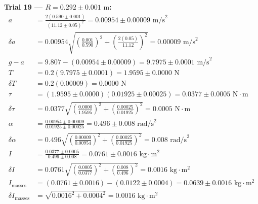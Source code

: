 \documentclass[11pt]{article}
\begin{document}
\textbf{Trial 19 — $R = 0.292 \pm 0.001\text{ m}$:}
\begin{align*}
a &= \frac{2(0.590 \pm 0.001)}{(11.12 \pm 0.05)^2} = 0.00954 \pm 0.00009\text{ m/s}^2 \\
\delta a &= 0.00954\sqrt{\left(\frac{0.001}{0.590}\right)^2 + \left(\frac{2(0.05)}{11.12}\right)^2} = 0.00009\text{ m/s}^2 \\
g - a &= 9.807 - (0.00954 \pm 0.00009) = 9.7975 \pm 0.0001\text{ m/s}^2 \\
T &= 0.2(9.7975 \pm 0.0001) = 1.9595 \pm 0.0000\text{ N} \\
\delta T &= 0.2(0.00009) = 0.0000\text{ N} \\
\tau &= (1.9595 \pm 0.0000)(0.01925 \pm 0.00025) = 0.0377 \pm 0.0005\text{ N}\cdot\text{m} \\
\delta\tau &= 0.0377\sqrt{\left(\frac{0.0000}{1.9595}\right)^2 + \left(\frac{0.00025}{0.01925}\right)^2} = 0.0005\text{ N}\cdot\text{m} \\
\alpha &= \frac{0.00954 \pm 0.00009}{0.01925 \pm 0.00025} = 0.496 \pm 0.008\text{ rad/s}^2 \\
\delta\alpha &= 0.496\sqrt{\left(\frac{0.00009}{0.00954}\right)^2 + \left(\frac{0.00025}{0.01925}\right)^2} = 0.008\text{ rad/s}^2 \\
I &= \frac{0.0377 \pm 0.0005}{0.496 \pm 0.008} = 0.0761 \pm 0.0016\text{ kg}\cdot\text{m}^2 \\
\delta I &= 0.0761\sqrt{\left(\frac{0.0005}{0.0377}\right)^2 + \left(\frac{0.008}{0.496}\right)^2} = 0.0016\text{ kg}\cdot\text{m}^2 \\
I_{\text{masses}} &= (0.0761 \pm 0.0016) - (0.0122 \pm 0.0004) = 0.0639 \pm 0.0016\text{ kg}\cdot\text{m}^2 \\
\delta I_{\text{masses}} &= \sqrt{0.0016^2 + 0.0004^2} = 0.0016\text{ kg}\cdot\text{m}^2
\end{align*}
\end{document}
